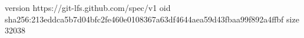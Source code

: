 version https://git-lfs.github.com/spec/v1
oid sha256:213eddca5b7d04bfc2fe460e0108367a63df4644aea59d43fbaa99f892a4ffbf
size 32038
